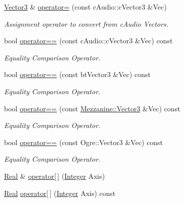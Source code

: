 \begin{DoxyCompactItemize}
\hyperlink{classMezzanine_1_1Vector3}{Vector3} \& \hyperlink{classMezzanine_1_1Vector3_ace3b3905cba40297982822c2d5659506}{operator=} (const cAudio::cVector3 \&Vec)
\begin{DoxyCompactList}\small\item\em Assignment operator to convert from cAudio Vectors. \item\end{DoxyCompactList}\item 
bool \hyperlink{classMezzanine_1_1Vector3_a528d444d3de6725449093ea205e37323}{operator==} (const cAudio::cVector3 \&Vec) const 
\begin{DoxyCompactList}\small\item\em Equality Comparison Operator. \item\end{DoxyCompactList}\item 
bool \hyperlink{classMezzanine_1_1Vector3_a1689523b98fe6ec2ffdda1a0f927945c}{operator==} (const btVector3 \&Vec) const 
\begin{DoxyCompactList}\small\item\em Equality Comparison Operator. \item\end{DoxyCompactList}\item 
bool \hyperlink{classMezzanine_1_1Vector3_a5404f12b72f25712c37b20a302379ca4}{operator==} (const \hyperlink{classMezzanine_1_1Vector3}{Mezzanine::Vector3} \&Vec) const 
\begin{DoxyCompactList}\small\item\em Equality Comparison Operator. \item\end{DoxyCompactList}\item 
bool \hyperlink{classMezzanine_1_1Vector3_a3dc4329b6936634d248210924a5f3d34}{operator==} (const Ogre::Vector3 \&Vec) const 
\begin{DoxyCompactList}\small\item\em Equality Comparison Operator. \item\end{DoxyCompactList}\item 
\hyperlink{namespaceMezzanine_a726731b1a7df72bf3583e4a97282c6f6}{Real} \& \hyperlink{classMezzanine_1_1Vector3_a52d8bf3fe3a222aaf5d0d7d7cfa0665b}{operator\mbox{[}$\,$\mbox{]}} (\hyperlink{namespaceMezzanine_ac3576e52af3c62d13dde94829e0c5465}{Integer} Axis)
\item 
\hyperlink{namespaceMezzanine_a726731b1a7df72bf3583e4a97282c6f6}{Real} \hyperlink{classMezzanine_1_1Vector3_a32ec319d2fa708e9ef04b2456bab916f}{operator\mbox{[}$\,$\mbox{]}} (\hyperlink{namespaceMezzanine_ac3576e52af3c62d13dde94829e0c5465}{Integer} Axis) const 

\end{DoxyCompactItemize}
